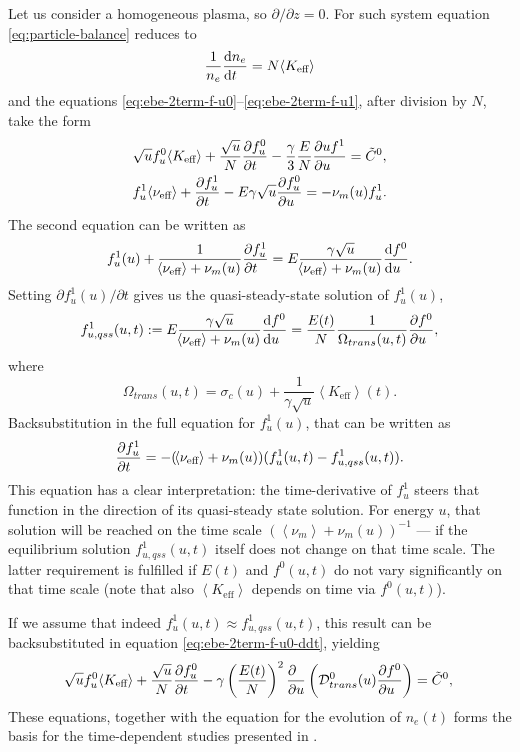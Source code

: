 \documentclass{book}
\newcommand{\MEAN}[1]{\ensuremath{\!\left\langle{{#1}}\right\rangle}}
\begin{document}
Let us consider a homogeneous plasma, so $\partial/\partial z=0$. For such system
equation \eqref{eq:particle-balance} reduces to
\begin{equation}
	\frac{1}{n_e}\DERIV{n_e}{t} = N\MEAN{K_{\text{eff}}}
\end{equation}
and the equations \eqref{eq:ebe-2term-f-u0}--\eqref{eq:ebe-2term-f-u1},
after division by $N$, take the form
\begin{align}
	&\sqrt{u}f^0_u\MEAN{K_{\text{eff}}}
	+\frac{\sqrt{u}}{N}\PDEV{f^0_u}{t}
	- \frac{\gamma}{3}\frac{E}{N}\PDEV{u f^1}{u}
	= \tilde{C}^0,
	\label{eq:ebe-2term-f-u0-ddt} \\
	&f^1_u\MEAN{\nu_{\text{eff}}}
	+\PDEV{f^1_u}{t}
	- E\gamma \sqrt{u}\PDEV{f^0_u}{u}
	= -\nu_m(u)f^1_u.
	\label{eq:ebe-2term-f-u-ddt1}
\end{align}
The second equation can be written as
\begin{equation}
	f^1_u(u)
	+ \frac{1}{\MEAN{\nu_{\text{eff}}}+\nu_m(u)}\PDEV{f^1_u}{t}
	= E\frac{\gamma\sqrt{u}}{\MEAN{\nu_{\text{eff}}}+\nu_m(u)}\DERIV{f^0}{u}.
\end{equation}
Setting $\partial f^1_u(u)/\partial t$ gives us the quasi-steady-state solution of $f^1_u(u)$,
\begin{equation}
	f^1_{u,qss}(u,t)
	:= E\frac{\gamma\sqrt{u}}{\MEAN{\nu_{\text{eff}}}+\nu_m(u)}\DERIV{f^0}{u}
	= \frac{E(t)}{N}\frac{1}{\Omega_{trans}(u,t)}\PDEV{f^0}{u},
\end{equation}
where
\begin{equation}
	\Omega_{trans}(u,t) = \sigma_c(u) + \frac{1}{\gamma\sqrt{u}}\MEAN{K_{\text{eff}}}(t).
\end{equation}
Backsubstitution in the full equation for $f^1_u(u)$, that can be written as
\begin{equation}
	\PDEV{f^1_u}{t} = -(\MEAN{\nu_{\text{eff}}}+\nu_m(u))(f^1_u(u,t)-f^1_{u,qss}(u,t)).
\end{equation}
This equation has a clear interpretation: the time-derivative of $f^1_u$ steers that
function in the direction of its quasi-steady state solution. For energy $u$, that
solution will be reached on the time scale $(\MEAN{\nu_m}+\nu_m(u))^{-1}$ --- if the
equilibrium solution $f^1_{u,qss}(u,t)$ itself does not change on that time scale.
The latter requirement is fulfilled if $E(t)$ and $f^0(u,t)$ do not vary significantly
on that time scale (note that also $\MEAN{K_{\text{eff}}}$ depends on time via $f^0(u,t)$).

If we assume that indeed $f^1_u(u,t)\approx f^1_{u,qss}(u,t)$, this result can be
backsubstituted in equation \eqref{eq:ebe-2term-f-u0-ddt}, yielding
\begin{equation}
	\sqrt{u}f^0_u\MEAN{K_{\text{eff}}}
	+\frac{\sqrt{u}}{N}\PDEV{f^0_u}{t}
	- \gamma\left(\frac{E(t)}{N}\right)^2\PDEV{}{u}\left({\cal D}_{trans}^0(u)\PDEV{f^0}{u}\right)
	= \tilde{C}^0,
	\label{eq:ebe-2term-f-u0-ddt-subst} \\
\end{equation}
These equations, together with the equation for the evolution of $n_e(t)$ forms the
basis for the time-dependent studies presented in \cite{Tejero2021}.
\end{document}
